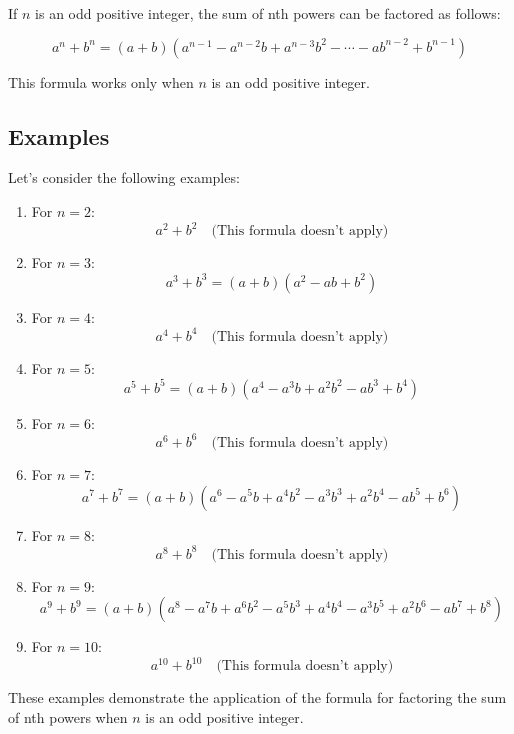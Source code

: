 \documentclass{article}
\begin{document}
If \( n \) is an odd positive integer, the sum of nth powers can be factored as follows:

\[
a^n + b^n = (a + b)(a^{n-1} - a^{n-2}b + a^{n-3}b^2 - \cdots - ab^{n-2} + b^{n-1})
\]

This formula works only when \( n \) is an odd positive integer.

\subsection*{Examples}

Let's consider the following examples:

\begin{enumerate}
    \item For \( n = 2 \):
    \[
    a^2 + b^2 \quad \text{(This formula doesn't apply)}
    \]
    
    \item For \( n = 3 \):
    \[
    a^3 + b^3 = (a + b)(a^2 - ab + b^2)
    \]
    
    \item For \( n = 4 \):
    \[
    a^4 + b^4 \quad \text{(This formula doesn't apply)}
    \]
    
    \item For \( n = 5 \):
    \[
    a^5 + b^5 = (a + b)(a^4 - a^3b + a^2b^2 - ab^3 + b^4)
    \]
    
    \item For \( n = 6 \):
    \[
    a^6 + b^6 \quad \text{(This formula doesn't apply)}
    \]
    
    \item For \( n = 7 \):
    \[
    a^7 + b^7 = (a + b)(a^6 - a^5b + a^4b^2 - a^3b^3 + a^2b^4 - ab^5 + b^6)
    \]
    
    \item For \( n = 8 \):
    \[
    a^8 + b^8 \quad \text{(This formula doesn't apply)}
    \]
    
    \item For \( n = 9 \):
    \[
    a^9 + b^9 = (a + b)(a^8 - a^7b + a^6b^2 - a^5b^3 + a^4b^4 - a^3b^5 + a^2b^6 - ab^7 + b^8)
    \]
    
    \item For \( n = 10 \):
    \[
    a^{10} + b^{10} \quad \text{(This formula doesn't apply)}
    \]
\end{enumerate}

These examples demonstrate the application of the formula for factoring the sum of nth powers when \( n \) is an odd positive integer.
\end{document}
